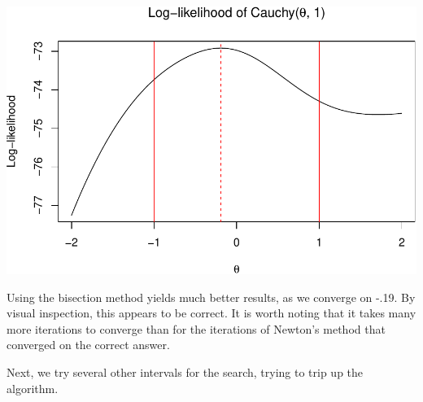 \documentclass[]{article}
\begin{document}
\includegraphics{Atlas-PS_2_files/figure-latex/plot_bisection-1.pdf}

Using the bisection method yields much better results, as we converge on
-.19. By visual inspection, this appears to be correct. It is worth
noting that it takes many more iterations to converge than for the
iterations of Newton's method that converged on the correct answer.

Next, we try several other intervals for the search, trying to trip up
the algorithm.
\end{document}
